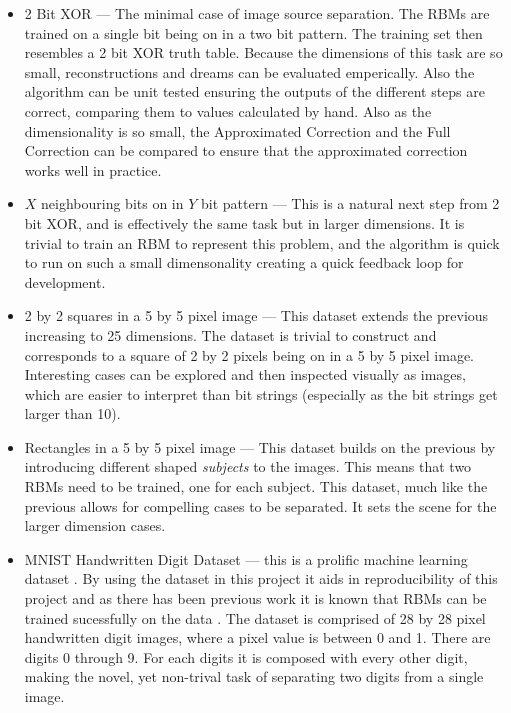 \begin{itemize}
  \item 2 Bit XOR --- The minimal case of image source separation. The RBMs are trained on a single bit being on in a two bit pattern. The training set then resembles a 2 bit XOR truth table. Because the dimensions of this task are so small, reconstructions and dreams can be evaluated emperically. Also the algorithm can be unit tested ensuring the outputs of the different steps are correct, comparing them to values calculated by hand. Also as the dimensionality is so small, the Approximated Correction \todocite{\ref{}} and the Full Correction \todocite{\ref{}} can be compared to ensure that the approximated correction works well in practice.
  \item $X$ neighbouring bits on in $Y$ bit pattern --- This is a natural next step from 2 bit XOR, and is effectively the same task but in larger dimensions. It is trivial to train an RBM to represent this problem, and the algorithm is quick to run on such a small dimensonality creating a quick feedback loop for development.
  \item 2 by 2 squares in a 5 by 5 pixel image --- This dataset extends the previous increasing to 25 dimensions. The dataset is trivial to construct and corresponds to a square of 2 by 2 pixels being on in a 5 by 5 pixel image. Interesting cases can be explored and then inspected visually as images, which are easier to interpret than bit strings (especially as the bit strings get larger than 10).
  \item Rectangles in a 5 by 5 pixel image --- This dataset builds on the previous by introducing different shaped \emph{subjects} to the images. This means that two RBMs need to be trained, one for each subject. This dataset, much like the previous allows for compelling cases to be separated. It sets the scene for the larger dimension cases.
  \item MNIST Handwritten Digit Dataset ---  this is a prolific machine learning dataset . By using the dataset in this project it aids in reproducibility of this project and as there has been previous work it is known that RBMs can be trained sucessfully on the data . The dataset is comprised of 28 by 28 pixel handwritten digit images, where a pixel value is between 0 and 1. There are digits 0 through 9. For each digits it is composed with every other digit, making the novel, yet non-trival task of separating two digits from a single image.
\end{itemize}




